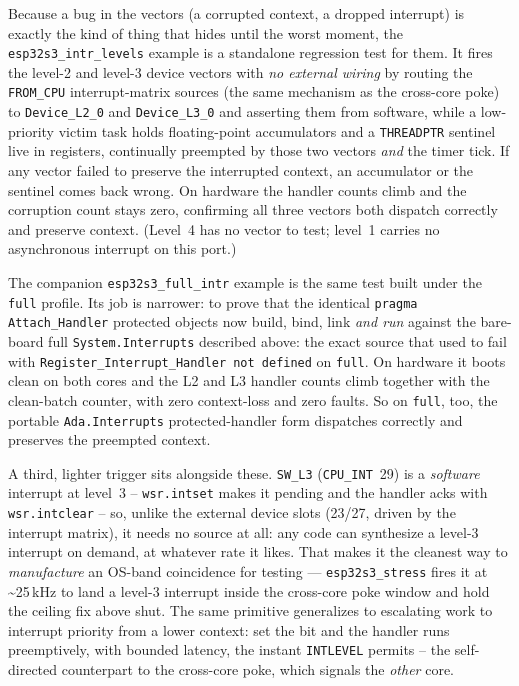 Because a bug in the vectors (a corrupted context, a dropped interrupt) is exactly
the kind of thing that hides until the worst moment, the
\texttt{esp32s3\_intr\_levels} example is a standalone regression test for them. It
fires the level-2 and level-3 device vectors with \emph{no external wiring} by
routing the \texttt{FROM\_CPU} interrupt-matrix sources (the same mechanism as the
cross-core poke) to \texttt{Device\_L2\_0} and \texttt{Device\_L3\_0} and asserting
them from software, while a low-priority victim task holds floating-point
accumulators and a \texttt{THREADPTR} sentinel live in registers, continually
preempted by those two vectors \emph{and} the timer tick. If any vector failed
to preserve the interrupted context, an accumulator or the sentinel comes back
wrong. On hardware the handler counts climb and the corruption count stays zero,
confirming all three vectors both dispatch correctly and preserve context.
(Level~4 has no vector to test; level~1 carries no asynchronous interrupt on this
port.)

The companion \texttt{esp32s3\_full\_intr} example is the same test built under
the \texttt{full} profile. Its job is narrower: to prove that the identical
\texttt{pragma Attach\_Handler} protected objects now build, bind, link \emph{and
run} against the bare-board full \texttt{System.Interrupts} described above:
the exact source that used to fail with \texttt{Register\_Interrupt\_Handler not
defined} on \texttt{full}. On hardware it boots clean on both cores and the L2
and L3 handler counts climb together with the clean-batch counter, with zero
context-loss and zero faults. So on \texttt{full}, too, the portable
\texttt{Ada.Interrupts} protected-handler form dispatches correctly and preserves
the preempted context.

A third, lighter trigger sits alongside these. \texttt{SW\_L3}
(\texttt{CPU\_INT}~29) is a \emph{software} interrupt at level~3 --
\texttt{wsr.intset} makes it pending and the handler acks with
\texttt{wsr.intclear} -- so, unlike the external device slots (23/27, driven
by the interrupt matrix), it needs no source at all: any code can synthesize
a level-3 interrupt on demand, at whatever rate it likes. That makes it the
cleanest way to \emph{manufacture} an OS-band coincidence for testing ---
\texttt{esp32s3\_stress} fires it at \textasciitilde25\,kHz to land a level-3
interrupt inside the cross-core poke window and hold the ceiling fix above
shut. The same primitive generalizes to escalating work to interrupt
priority from a lower context: set the bit and the handler runs preemptively,
with bounded latency, the instant \texttt{INTLEVEL} permits -- the
self-directed counterpart to the cross-core poke, which signals the
\emph{other} core.
